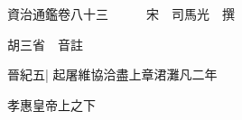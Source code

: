 






























































資治通鑑卷八十三　　　宋　司馬光　撰

胡三省　音註

晉紀五|{
	起屠維協洽盡上章涒灘凡二年}


孝惠皇帝上之下

